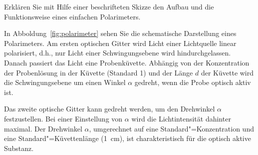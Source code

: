 \documentclass{scrartcl}
\begin{document}
\begin{question}[name=Polarimetrie]
  Erklären Sie mit Hilfe einer beschrifteten Skizze den Aufbau und die
  Funktionsweise eines einfachen Polarimeters.
\end{question}
\begin{solution}[name=Polarimetrie]
  In Abboldung~\ref{fig:polarimeter} sehen Sie die schematische Darstellung
  eines Polarimeters.  Am ersten optischen Gitter wird Licht einer Lichtquelle
  linear polarisiert, d.h., nur Licht einer Schwingungsebene wird
  hindurchgelassen.  Danach passiert das Licht eine Probenküvette.  Abhängig
  von der Konzentration der Probenlösung in der Küvette (Standard
  \SI{1}{\Molar}) und der Länge {\color{lencolor}$d$} der Küvette wird die
  Schwingungsebene um einen Winkel {\color{angcolor}$\alpha$} gedreht, wenn
  die Probe optisch aktiv ist.
        
  Das zweite optische Gitter kann gedreht werden, um den Drehwinkel
  {\color{angcolor}$\alpha$} festzustellen.  Bei einer Einstellung von
  {\color{angcolor}$\alpha$} wird die Lichtintensität dahinter maximal.
  Der Drehwinkel {\color{angcolor}$\alpha$}, umgerechnet auf eine
  Standard"=Konzentration und eine Standard"=Küvettenlänge (\SI{1}{cm}), ist
  charakteristisch für die optisch aktive Substanz.
\end{solution}
\end{document}
